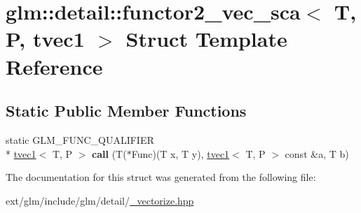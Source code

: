 \hypertarget{structglm_1_1detail_1_1functor2__vec__sca_3_01_t_00_01_p_00_01tvec1_01_4}{\section{glm\-:\-:detail\-:\-:functor2\-\_\-vec\-\_\-sca$<$ T, P, tvec1 $>$ Struct Template Reference}
\label{structglm_1_1detail_1_1functor2__vec__sca_3_01_t_00_01_p_00_01tvec1_01_4}
}
\subsection*{Static Public Member Functions}
\begin{DoxyCompactItemize}
\item 
\hypertarget{structglm_1_1detail_1_1functor2__vec__sca_3_01_t_00_01_p_00_01tvec1_01_4_a2a66b135799442e1bdee02afc859064d}{static G\-L\-M\-\_\-\-F\-U\-N\-C\-\_\-\-Q\-U\-A\-L\-I\-F\-I\-E\-R \\*
\hyperlink{structglm_1_1tvec1}{tvec1}$<$ T, P $>$ {\bfseries call} (T($\ast$Func)(T x, T y), \hyperlink{structglm_1_1tvec1}{tvec1}$<$ T, P $>$ const \&a, T b)}\label{structglm_1_1detail_1_1functor2__vec__sca_3_01_t_00_01_p_00_01tvec1_01_4_a2a66b135799442e1bdee02afc859064d}

\end{DoxyCompactItemize}


The documentation for this struct was generated from the following file\-:\begin{DoxyCompactItemize}
\item 
ext/glm/include/glm/detail/\hyperlink{__vectorize_8hpp}{\-\_\-vectorize.\-hpp}\end{DoxyCompactItemize}
